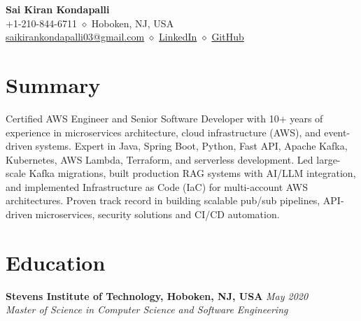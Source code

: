 \documentclass[11pt,a4paper]{article}
\newcommand{\resumeHeader}[4]{
    \begin{center}
        {\Huge\bfseries #1}\\[0.5cm]
        #2 \quad $\diamond$ \quad #3\\[0.2cm]
        #4
    \end{center}
}
\begin{document}
\resumeHeader{Sai Kiran Kondapalli}
{+1-210-844-6711}
{Hoboken, NJ, USA}
{\href{mailto:saikirankondapalli03@gmail.com}{saikirankondapalli03@gmail.com} \quad $\diamond$ \quad \href{https://www.linkedin.com/in/saikirankondapalli}{LinkedIn} \quad $\diamond$ \quad \href{https://github.com/saikirankondapalli}{GitHub}}

\section{Summary}
\small\raggedright{Certified AWS Engineer and Senior Software Developer with 10+ years of experience in microservices architecture, cloud infrastructure (AWS), and event-driven systems. Expert in Java, Spring Boot, Python, Fast API, Apache Kafka, Kubernetes, AWS Lambda, Terraform, and serverless development. Led large-scale Kafka migrations, built production RAG systems with AI/LLM integration, and implemented Infrastructure as Code (IaC) for multi-account AWS architectures. Proven track record in building scalable pub/sub pipelines, API-driven microservices, security solutions and CI/CD automation.}

\section{Education}
\textbf{Stevens Institute of Technology, Hoboken, NJ, USA} \hfill \textit{May 2020}\\
\textit{Master of Science in Computer Science and Software Engineering}

\end{document}
